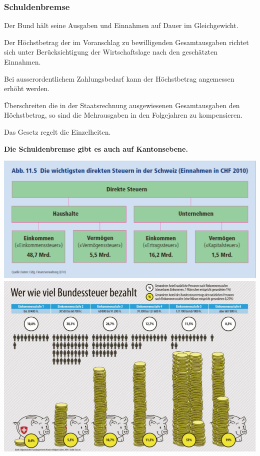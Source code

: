 \subsubsection{Schuldenbremse}
\begin{description}
	\item[Grundsatz] Der Bund hält seine Ausgaben und Einnahmen auf Dauer im Gleichgewicht.
	\item[Ausgabenregel] Der Höchstbetrag der im Voranschlag zu bewilligenden Gesamtausgaben richtet sich unter Berücksichtigung der Wirtschaftslage nach den geschätzten Einnahmen.
	\item[Ausnahme] Bei ausserordentlichem Zahlungsbedarf kann der Höchstbetrag angemessen erhöht werden.
	\item[Sanktionen] Überschreiten die in der Staatsrechnung ausgewiesenen Gesamtausgaben den Höchstbetrag, so sind die Mehrausgaben in den Folgejahren zu kompensieren.
	\item[Umsetzung] Das Gesetz regelt die Einzelheiten.
	\item \textbf{Die Schuldenbremse gibt es auch auf Kantonsebene.}
\end{description}

\begin{multicols}{2}
	\includegraphics[width=\linewidth]{images/direkteSteuern.png}
	\vfill\null
	\columnbreak
	\includegraphics[width=\linewidth]{images/bundessteuern.png}
\end{multicols}

